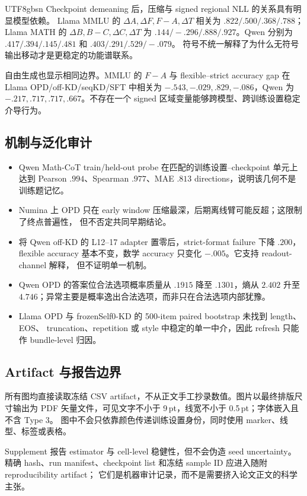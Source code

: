 \documentclass[letterpaper]{article} %
\begin{document}
\begin{CJK*}{UTF8}{gbsn}
Checkpoint demeaning 后，压缩与 signed regional NLL 的关系具有明显模型依赖。
Llama MMLU 的 $\Delta A,\Delta F,F-A,\Delta T$ 相关为
$.822/.500/.368/.788$；Llama MATH 的 $\Delta B,B-C,\Delta C,\Delta T$ 为
$.144/-.296/.888/.927$。Qwen 分别为
$.417/.394/.145/.481$ 和 $.403/.291/.529/-.079$。
符号不统一解释了为什么无符号输出移动才是更稳定的功能谱联系。

自由生成也显示相同边界。MMLU 的 $F-A$ 与 flexible--strict accuracy gap 在
Llama OPD/off-KD/seqKD/SFT 中相关为
$-.543,-.029,.829,-.086$，Qwen 为
$-.217,.717,.717,.667$。不存在一个 signed 区域变量能够跨模型、跨训练设置稳定介导行为。

\subsection{机制与泛化审计}

\begin{itemize}
    \item Qwen Math-CoT train/held-out probe 在匹配的训练设置--checkpoint 单元上达到
    Pearson $.994$、Spearman $.977$、MAE $.813$ directions，说明该几何不是训练题记忆。
    \item Numina 上 OPD 只在 early window 压缩最深，后期离线臂可能反超；这限制了终点普遍性，
    但不否定共同早期结论。
    \item 将 Qwen off-KD 的 L12--17 adapter 置零后，strict-format failure 下降 $.200$，
    flexible accuracy 基本不变，数学 accuracy 只变化 $-.005$。它支持 readout-channel 解释，
    但不证明单一机制。
    \item Qwen OPD 的答案位合法选项概率质量从 $.1915$ 降至 $.1301$，熵从 $2.402$ 升至
    $4.746$；异常主要是概率逸出合法选项，而非只在合法选项内部犹豫。
    \item Llama OPD 与 frozenSelf0-KD 的 500-item paired bootstrap 未找到 length、EOS、
    truncation、repetition 或 style 中稳定的单一中介，因此 refresh 只能作 bundle-level 归因。
\end{itemize}

\subsection{Artifact 与报告边界}

所有图均直接读取冻结 CSV artifact，不从正文手工抄录数值。图片以最终排版尺寸输出为
PDF 矢量文件，可见文字不小于 9\,pt，线宽不小于 0.5\,pt；字体嵌入且不含 Type 3。
图中不会只依靠颜色传递训练设置身份，同时使用 marker、线型、标签或表格。

Supplement 报告 estimator 与 cell-level 稳健性，但不会伪造 seed uncertainty。
精确 hash、run manifest、checkpoint list 和冻结 sample ID 应进入随附 reproducibility artifact；
它们是机器审计记录，而不是需要挤入论文正文的科学主张。

\end{CJK*}
\end{document}
